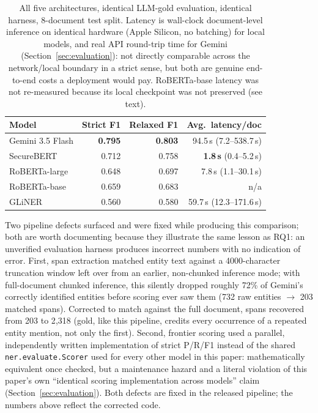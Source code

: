 \documentclass[11pt]{article}
\begin{document}
\begin{table}[t]
\centering
\scriptsize
\setlength{\tabcolsep}{3pt}
\begin{tabular}{lrrr}
\toprule
Model & Strict F1 & Relaxed F1 & Avg.\ latency/doc \\
\midrule
Gemini 3.5 Flash & \textbf{0.795} & \textbf{0.803} & 94.5\,s (7.2--538.7\,s) \\
SecureBERT & 0.712 & 0.758 & \textbf{1.8\,s} (0.4--5.2\,s) \\
RoBERTa-large & 0.648 & 0.697 & 7.8\,s (1.1--30.1\,s) \\
RoBERTa-base & 0.659 & 0.683 & n/a \\
GLiNER & 0.560 & 0.580 & 59.7\,s (12.3--171.6\,s) \\
\bottomrule
\end{tabular}
\caption{All five architectures, identical LLM-gold evaluation, identical
harness, 8-document test split. Latency is wall-clock document-level
inference on identical hardware (Apple Silicon, no batching) for local
models, and real API round-trip time for Gemini
(Section~\ref{sec:evaluation}): not directly comparable across the
network/local boundary in a strict sense, but both are genuine end-to-end
costs a deployment would pay. RoBERTa-base latency was not re-measured
because its local checkpoint was not preserved (see text).}
\label{tab:frontier}
\end{table}

Two pipeline defects surfaced and were fixed while producing this
comparison; both are worth documenting because they illustrate the same
lesson as RQ1: an unverified evaluation harness produces incorrect
numbers with no indication of error. First, span extraction matched entity text against a
4000-character truncation window left over from an earlier, non-chunked
inference mode; with full-document chunked inference, this silently dropped
roughly 72\% of Gemini's correctly identified entities before scoring ever
saw them (732 raw entities $\to$ 203 matched spans). Corrected to match
against the full document, spans recovered from 203 to 2{,}318 (gold, like
this pipeline, credits every occurrence of a repeated entity mention, not
only the first). Second, frontier scoring used a parallel, independently
written implementation of strict P/R/F1 instead of the shared
\texttt{ner.evaluate.Scorer} used for every other model in this
paper: mathematically equivalent once checked, but a maintenance hazard
and a literal violation of this paper's own ``identical scoring
implementation across models'' claim (Section~\ref{sec:evaluation}). Both
defects are fixed in the released pipeline; the numbers above reflect the
corrected code.
\end{document}

